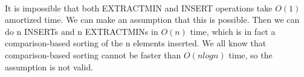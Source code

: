 \begin{problem}{3} ~\\
It is impossible that both EXTRACTMIN and INSERT operations take $O(1)$ amortized time. We can make an assumption that this is possible. Then we can do n INSERTs and n EXTRACTMINs in $O(n)$ time, which is in fact a comparison-based sorting of the n elements inserted. We all know that comparison-based sorting cannot be faster than $O(nlogn)$ time, so the assumption is not valid.
\end{problem}